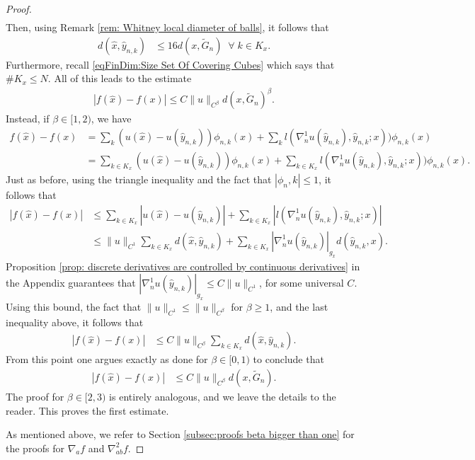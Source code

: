 \documentclass[11pt,reqno]{amsart}
\numberwithin{equation}{section}
\theoremstyle{plain}
\begin{document}
\begin{proof}
\begin{align*}
    \end{align*}  
    Then, using Remark \ref{rem: Whitney local diameter of balls}, it follows that
    \begin{align}	 
      d(\hat x,\hat y_{n,k}) & \leq 16d(x,\tilde G_n)	\;\;\forall\;k\in K_x.\label{eqFinDim:hat x and hat Ynk distance is bounded by distance to tilde Gn}				
    \end{align}  	
    Furthermore, recall \eqref{eqFinDim:Size Set Of Covering Cubes} which says that $\#K_x\leq N$. All of this leads to the estimate
    \begin{align*}
      |f(\hat x)-f(x)| \leq C\|u\|_{C^\beta} d(x,\tilde G_n)^{\beta}.
    \end{align*}
    Instead, if $\beta \in [1,2)$, we have	
   \begin{align*}	  
      f(\hat x)-f(x) & = \sum \limits_{k} (u(\hat x)-u(\hat y_{n,k}))\phi_{n,k}(x) + \sum \limits_{k}l(\nabla_n^1u(\hat y_{n,k}),\hat y_{n,k};x ))\phi_{n,k}(x)\\
  	  & = \sum \limits_{k\in K_x} (u(\hat x)-u(\hat y_{n,k}))\phi_{n,k}(x)+ \sum \limits_{k\in K_x}l(\nabla_n^1u(\hat y_{n,k}),\hat y_{n,k};x ))\phi_{n,k}(x).
    \end{align*}	
   Just as before, using the triangle inequality and the fact that $|\phi_n,k|\leq 1$, it follows that 	
   \begin{align*}	  
      |f(\hat x)-f(x)| & \leq \sum \limits_{k\in K_x} |u(\hat x)-u(\hat y_{n,k})|+ \sum \limits_{k\in K_x}|l(\nabla_n^1u(\hat y_{n,k}),\hat y_{n,k};x )|\\
	  & \leq \|u\|_{C^1}\sum \limits_{k\in K_x} d(\hat x,\hat y_{n,k})+\sum \limits_{k\in K_x} |\nabla_n^1 u (\hat y_{n,k})|_{g_x}d(\hat y_{n,k},x).
    \end{align*}	
   Proposition \ref{prop: discrete derivatives are controlled by continuous derivatives} in the Appendix guarantees that $|\nabla_n^1 u (\hat y_{n,k})|_{g_x} \leq C\|u\|_{C^1}$, for some universal $C$. Using this bound, the fact that $\|u\|_{C^1}\leq \|u\|_{C^\beta}$ for $\beta\geq 1$, and the last inequality above, it follows that
   \begin{align*}	  
      |f(\hat x)-f(x)| & \leq C\|u\|_{C^\beta}\sum \limits_{k\in K_x} d(\hat x,\hat y_{n,k}).
   \end{align*}	  		
   From this point one argues exactly as done for $\beta \in [0,1)$ to conclude that
   \begin{align*}	  
      |f(\hat x)-f(x)| & \leq C\|u\|_{C^\beta}d(x,\tilde G_n).
   \end{align*}	  		   
   The proof for $\beta \in [2,3)$ is entirely analogous, and we leave the details to the reader. This proves the first estimate.
   	
    As mentioned above, we refer to Section \ref{subsec:proofs beta bigger than one} for the proofs for $\nabla_a f$ and $\nabla_{ab}^2 f$.
	
\end{proof}
\end{document}
